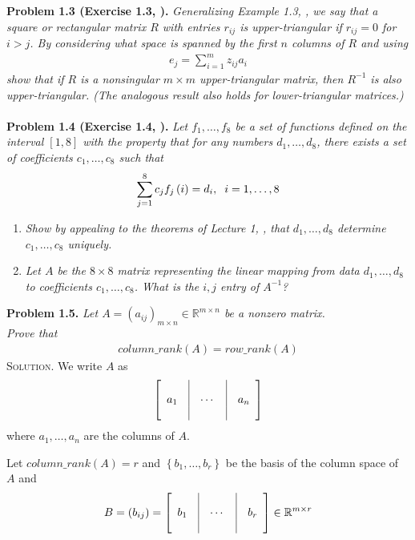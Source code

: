 \documentclass[a4paper,oneside]{book}
\numberwithin{equation}{chapter}
\begin{document}
\textbf{Problem 1.3 (Exercise 1.3, \cite{1}).} \textit{Generalizing Example 1.3, \cite{1}, we say that a square or rectangular matrix $R$ with entries $r_{ij}$ is upper-triangular if $r_{ij}=0$ for $i>j$. By considering what space is spanned by the first $n$ columns of $R$ and using}
\begin{align}
{e_j} = \sum\limits_{i = 1}^m {{z_{ij}}{a_i}} 
\end{align}
\textit{show that if $R$ is a nonsingular $m\times m$ upper-triangular matrix, then $R^{-1}$ is also upper-triangular. (The analogous result also holds for lower-triangular matrices.)}\\
\\
\textbf{Problem 1.4 (Exercise 1.4, \cite{1}).} \textit{Let $f_1,\ldots,f_8$ be a set of functions defined on the interval $\left[1,8\right]$ with the property that for any numbers $d_1,\ldots,d_8$, there exists a set of coefficients $c_1,\ldots,c_8$ such that}
\begin{align}
\sum\limits_{j = 1}^8 {{c_j}{f_j}\left( i \right)}  = {d_i},\hspace{0.2cm} i = 1, \ldots ,8
\end{align}
\begin{enumerate}
\item \textit{Show by appealing to the theorems of Lecture 1, \cite{1}, that $d_1,\ldots,d_8$ determine $c_1,\ldots,c_8$ uniquely.}
\item \textit{Let $A$ be the $8\times 8$ matrix representing the linear mapping from data $d_1,\ldots,d_8$ to coefficients $c_1,\ldots,c_8$. What is the $i,j$ entry of $A^{-1}$?}
\end{enumerate}
\textbf{Problem 1.5.} \textit{Let $A = {\left( {{a_{ij}}} \right)_{m \times n}} \in {\mathbb{R}^{m \times n}}$ be a nonzero matrix.\\
Prove that}
\begin{align}
column\_rank\left( A \right) = row\_rank\left( A \right)
\end{align}
\textsc{Solution.} We write $A$ as
\begin{align}
\left[ {\begin{array}{*{20}{c}}
{}&\vline& {}&\vline& {}\\
{{a_1}}&\vline&  \cdots &\vline& {{a_n}}\\
{}&\vline& {}&\vline& {}
\end{array}} \right]
\end{align}
where $a_1,\ldots,a_n$ are the columns of $A$.

Let $column\_rank\left(A\right)=r$ and $\left\{ {{b_1}, \ldots ,{b_r}} \right\}$ be the basis of the column space of $A$ and
\begin{align}
B = \left( {{b_{ij}}} \right) = \left[ {\begin{array}{*{20}{c}}
{}&\vline& {}&\vline& {}\\
{{b_1}}&\vline&  \cdots &\vline& {{b_r}}\\
{}&\vline& {}&\vline& {}
\end{array}} \right] \in {\mathbb{R}^{m \times r}}
\end{align}
\end{document}
